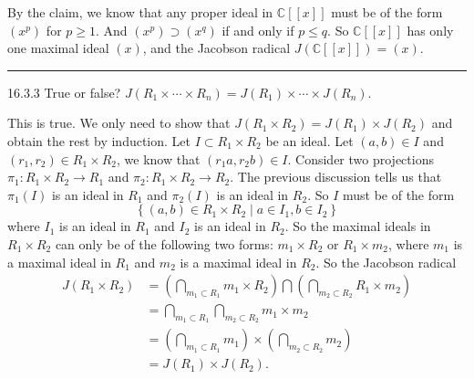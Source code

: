 \documentclass[a4paper, 12pt]{article}
\begin{document}
\begin{solution}
By the claim, we know that any proper ideal in \(\mathbb{C}[[x]]\) must be of the form \((x^p)\) for \(p\geq 1\). And \((x^p)\supset (x^q)\) if and only if \(p\leq q\). So \(\mathbb{C}[[x]]\) has only one maximal ideal \((x)\), and the Jacobson radical 
\(J(\mathbb{C}[[x]])=(x)\).
\end{solution}

\noindent\rule{7in}{2.8pt}
\begin{problem}{16.3.3}
True or false? \(J(R_1\times \cdots\times R_n)=J(R_1)\times \cdots\times J(R_n)\).
\end{problem}
\begin{solution}
This is true. We only need to show that \(J(R_1\times R_2)=J(R_1)\times J(R_2)\) and obtain the rest by induction. Let \(I\subset R_1\times R_2\) be an ideal. Let \((a,b)\in I\) and \((r_1,r_2)\in R_1\times R_2\), we know that 
\((r_1a,r_2b)\in I\). Consider two projections \(\pi_1:R_1\times R_2\rightarrow R_1\) and \(\pi_2:R_1\times R_2\rightarrow R_2\). The previous discussion tells us that \(\pi_1(I)\) is an ideal in \(R_1\) and \(\pi_2(I)\) is an ideal 
in \(R_2\). So \(I\) must be of the form 
\[\left\{ (a,b)\in R_1\times R_2\mid a\in I_1,b\in I_2 \right\}\]
where \(I_1\) is an ideal in \(R_1\) and \(I_2\) is an ideal in \(R_2\). So the maximal ideals in \(R_1\times R_2\) can only be of the following two forms: \(m_1\times R_2\) or \(R_1\times m_2\), where \(m_1\) is a maximal ideal in \(R_1\) and 
\(m_2\) is a maximal ideal in \(R_2\). So the Jacobson radical 
\begin{align*}
J(R_1\times R_2)&=(\bigcap_{m_1\subset R_1}m_1\times R_2)\bigcap(\bigcap_{m_2\subset R_2}R_1\times m_2)\\ 
                &=\bigcap_{m_1\subset R_1}\bigcap_{m_2\subset R_2}m_1\times m_2\\ 
                &=(\bigcap_{m_1\subset R_1}m_1)\times (\bigcap_{m_2\subset R_2}m_2)\\ 
                &=J(R_1)\times J(R_2).
\end{align*}
\end{solution}
\end{document}
